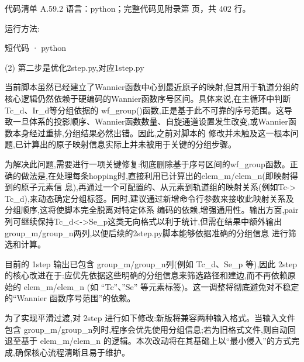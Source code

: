 \documentclass[lang=cn,scheme=chinese,color=blue,device=normal,toc=onecol,math=cm]{elegantbook}
\begin{document}
\begin{codeindexbox}{代码清单 A.59.2}
语言：python；完整代码见附录第 \pageref{code:59:2} 页，共 402 行。
\end{codeindexbox}


运行方法:\par


\begin{inlinecodebox}{短代码 · python}
\end{inlinecodebox}


(2) 第二步是优化2step.py,对应1step.py\par


当前脚本虽然已经建立了Wannier函数中心到最近原子的映射,但其用于轨道分组的核心逻辑仍然依赖于硬编码的Wannier函数序号区间。具体来说,在主循环中判断Tc\_\allowbreak{}d、Ir\_\allowbreak{}d等分组依据的 wf\_\allowbreak{}group()函数,正是基于此不可靠的序号范围。这导致一旦体系的投影顺序、Wannier函数数量、自旋通道设置发生改变,或Wannier函数本身经过重排,分组结果必然出错。因此,之前对脚本的 修改并未触及这一根本问题,已计算出的原子映射信息实际上并未被用于关键的分组步骤。\par


为解决此问题,需要进行一项关键修复:彻底删除基于序号区间的wf\_\allowbreak{}group函数。正确的做法是,在处理每条hopping时,直接利用已计算出的elem\_\allowbreak{}m/\allowbreak{}elem\_\allowbreak{}n(即映射得到的原子元素信 息),再通过一个可配置的、从元素到轨道组的映射关系(例如Tc-> Tc\_\allowbreak{}d),来动态确定分组标签。同时,建议通过新增命令行参数来接收此映射关系及分组顺序,这将使脚本完全脱离对特定体系 编码的依赖,增强通用性。输出方面,pair列可继续保持Tc\_\allowbreak{}d<->Se\_\allowbreak{}p这类无向格式以利于统计,但需在结果中额外输出group\_\allowbreak{}m/\allowbreak{}group\_\allowbreak{}n两列,以便后续的2step.py脚本能够依据准确的分组信息 进行筛选和计算。\par


目前的 1step 输出已包含 group\_\allowbreak{}m/\allowbreak{}group\_\allowbreak{}n列(例如 Tc\_\allowbreak{}d、Se\_\allowbreak{}p 等),因此 2step 的核心改进在于:应优先依据这些明确的分组信息来筛选路径和建边,而不再依赖原始的 elem\_\allowbreak{}m/\allowbreak{}elem\_\allowbreak{}n (如 “Tc”、”Se” 等元素标签)。这一调整将彻底避免对不稳定的“Wannier 函数序号范围”的依赖。\par


为了实现平滑过渡,对 2step 进行如下修改:新版将兼容两种输入格式。当输入文件包含 group\_\allowbreak{}m/\allowbreak{}group\_\allowbreak{}n列时,程序会优先使用分组信息;若为旧格式文件,则自动回退至基于 elem\_\allowbreak{}m/\allowbreak{}elem\_\allowbreak{}n 的逻辑。本次改动将在其基础上以“最小侵入”的方式完成,确保核心流程清晰且易于维护。\par
\end{document}
